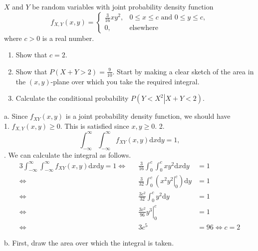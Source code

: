 \begin{exercise}
 $X$ and $Y$ be random variables with joint probability density function
$$f_{X,Y}(x,y) = \begin{cases}
    \frac{3}{16}xy^2, & 0\le x\le c\mbox{ and } 0\le y\le c,\\
    0, & \mbox{elsewhere}
\end{cases}$$ where $c>0$ is a real number.
\begin{enumerate}
\item  Show that $c = 2$.
\item Show that $P(X+Y>2) = \frac{9}{10}$. Start by making a clear sketch of the area in the $(x,y)$-plane over which you take the required integral.
\item Calculate the conditional probability $P\left(\left.Y<X^2\right|X+Y<2\right)$.
\end{enumerate}
\begin{solution}
a.            Since $f_{XY}(x,y)$ is a joint probability density function, we should have\\
            1. $f_{X,Y}(x,y)\geq 0$. This is satisfied since $x,y\geq 0$. %
            2.  $$\int_{-\infty}^{\infty}\int_{-\infty}^{\infty}f_{XY}(x,y)\text{d}x\text{d}y = 1,$$.
            We can calculate the integral as follows.
            \begin{alignat*}{3}
                \int_{-\infty}^{\infty}\int_{-\infty}^{\infty}f_{XY}(x,y)\text{d}x\text{d}y = 1\iff && \frac{3}{16}\int_{0}^{c}\int_{0}^{c}xy^2\text{d}x\text{d}y &= 1\\
                \iff && \frac{3}{32}\int_{0}^{c}\left(\left.x^2y^2\right|_0^c\right)\text{d}y &= 1\\
                \iff && \frac{3c^2}{32}\int_{0}^{c}y^2\text{d}y &= 1\\
                \iff && \left.\frac{3c^2}{96}y^3\right|_0^c &= 1\\
                \iff && 3c^5 &= 96
                \iff  c = 2 %
            \end{alignat*}

b. First, draw the area over which the integral is taken. %
            \begin{center}
\end{center}
\end{solution}
\end{exercise}
